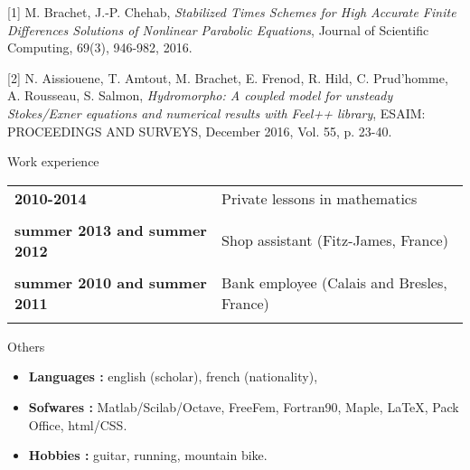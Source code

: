 \documentclass[10pt,a4paper]{report}
\begin{document}
\vspace{0.6cm}

[1] {\sc M. Brachet, J.-P. Chehab}, {\sl Stabilized Times Schemes for High Accurate Finite Differences Solutions of Nonlinear Parabolic Equations}, Journal of Scientific Computing, 69(3), 946-982, 2016.

\vspace{0.6cm}

[2] {\sc  N. Aissiouene, T. Amtout, M. Brachet, E. Frenod, R. Hild, C. Prud'homme, A. Rousseau, S. Salmon}, {\sl  Hydromorpho: A coupled model for unsteady Stokes/Exner equations and numerical results with Feel++ library}, ESAIM: PROCEEDINGS AND SURVEYS, December 2016, Vol. 55, p. 23-40.






\vspace{1cm}
\noindent
{\selectfont
\begin{Large}
Work experience
\end{Large}
\hrulefill
}

\vspace{0.6cm}
\noindent
\begin{center}
\begin{tabular}{p{5cm} p{10cm}}
\textbf{2010-2014} & Private lessons in mathematics\\

& \\

\textbf{summer 2013 and summer 2012} & Shop assistant (Fitz-James, France) \\

& \\

\textbf{summer 2010 and summer 2011} & Bank employee (Calais and Bresles, France) \\

& \\

\end{tabular}
\end{center}


\vspace{0.6cm}
\noindent
{\selectfont
\begin{Large}
Others
\end{Large}
\hrulefill
}

\vspace{1cm}
\noindent
\begin{itemize}
\item \textbf{Languages :} english (scholar), french (nationality),
\item \textbf{Sofwares :} Matlab/Scilab/Octave, FreeFem, Fortran90, Maple, \LaTeX, Pack Office, html/CSS.
\item \textbf{Hobbies :} guitar, running, mountain bike.

\end{itemize}
\end{document}

